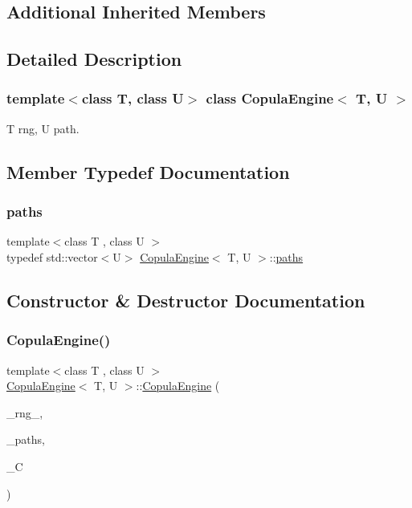 \subsection*{Additional Inherited Members}


\subsection{Detailed Description}
\subsubsection*{template$<$class T, class U$>$\newline
class Copula\+Engine$<$ T, U $>$}

T rng, U path. 

\subsection{Member Typedef Documentation}
\hypertarget{classCopulaEngine_a75e30032c9b2290243a83ea7d343a62c}{}\label{classCopulaEngine_a75e30032c9b2290243a83ea7d343a62c} 
\subsubsection{\texorpdfstring{paths}{paths}}
{\footnotesize\ttfamily template$<$class T , class U $>$ \\
typedef std\+::vector$<$U$>$ \hyperlink{classCopulaEngine}{Copula\+Engine}$<$ T, U $>$\+::\hyperlink{classMCEngine_a977f1048508a1467c496c2c47231d1d3}{paths}}



\subsection{Constructor \& Destructor Documentation}
\hypertarget{classCopulaEngine_af3eb5649a8e86dd99de690cac3e843f1}{}\label{classCopulaEngine_af3eb5649a8e86dd99de690cac3e843f1} 
\subsubsection{\texorpdfstring{Copula\+Engine()}{CopulaEngine()}\hspace{0.1cm}{\footnotesize\ttfamily [1/3]}}
{\footnotesize\ttfamily template$<$class T , class U $>$ \\
\hyperlink{classCopulaEngine}{Copula\+Engine}$<$ T, U $>$\+::\hyperlink{classCopulaEngine}{Copula\+Engine} (\begin{DoxyParamCaption}\item[{T \&}]{\+\_\+rng\+\_\+,  }\item[{const \hyperlink{classMCEngine_a977f1048508a1467c496c2c47231d1d3}{paths} \&}]{\+\_\+paths,  }\item[{const Eigen\+::\+Matrix\+Xd}]{\+\_\+C }\end{DoxyParamCaption})\hspace{0.3cm}{\ttfamily [inline]}}

